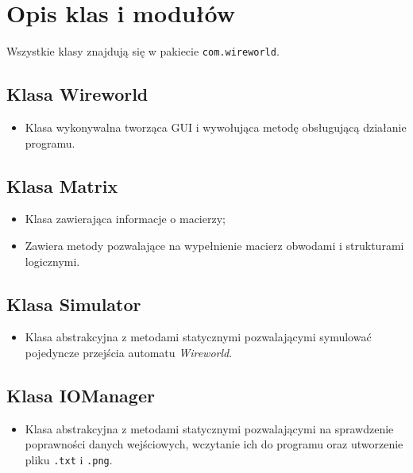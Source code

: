 \documentclass[a4paper,12pt]{article}
\begin{document}
\section{Opis klas i modułów}
Wszystkie klasy znajdują się w pakiecie \texttt{com.wireworld}.
\subsection{Klasa Wireworld}
\begin{itemize}
\item Klasa wykonywalna tworząca GUI i wywołująca metodę obsługującą działanie programu.
\end{itemize}
\subsection{Klasa Matrix}
\begin{itemize}
\item Klasa zawierająca informacje o macierzy;
\item Zawiera metody pozwalające na wypełnienie macierz obwodami i strukturami logicznymi.
\end{itemize}
\subsection{Klasa Simulator}
\begin{itemize}
\item Klasa abstrakcyjna z metodami statycznymi pozwalającymi symulować pojedyncze przejścia automatu \textit{Wireworld}.
\end{itemize}
\subsection{Klasa IOManager}
\begin{itemize}
\item Klasa abstrakcyjna z metodami statycznymi pozwalającymi na sprawdzenie poprawności danych wejściowych, wczytanie ich do programu oraz utworzenie pliku \texttt{.txt} i \texttt{.png}.
\end{itemize}
\end{document}
